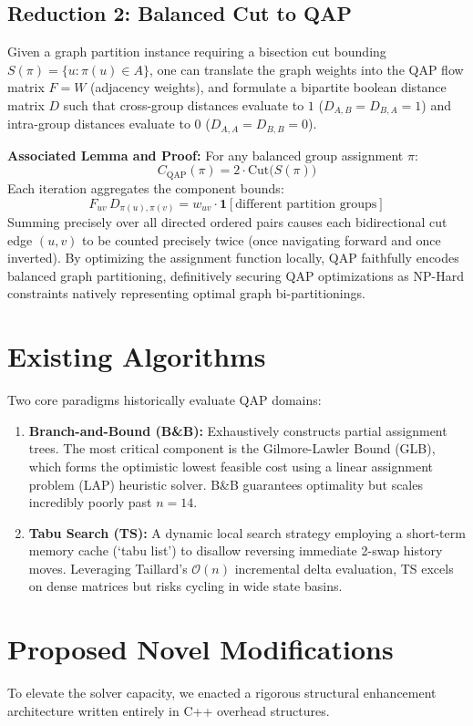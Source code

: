 \documentclass[sigconf,nonacm]{acmart}
\begin{document}
\subsection{Reduction 2: Balanced Cut to QAP}
Given a graph partition instance requiring a bisection cut bounding $S(\pi)=\{u : \pi(u)\in A\}$, one can translate the graph weights into the QAP flow matrix $F = W$ (adjacency weights), and formulate a bipartite boolean distance matrix $D$ such that cross-group distances evaluate to $1$ ($D_{A,B} = D_{B,A} = 1$) and intra-group distances evaluate to $0$ ($D_{A,A} = D_{B,B} = 0$). 

\textbf{Associated Lemma and Proof:}
For any balanced group assignment $\pi$:
\begin{equation}
  C_{\text{QAP}}(\pi) = 2\cdot\mathrm{Cut}\bigl(S(\pi)\bigr)
\end{equation}
Each iteration aggregates the component bounds:
$$F_{uv}\,D_{\pi(u),\pi(v)} = w_{uv}\cdot\mathbf{1}[\text{different partition groups}]$$
Summing precisely over all directed ordered pairs causes each bidirectional cut edge $(u,v)$ to be counted precisely twice (once navigating forward and once inverted). By optimizing the assignment function locally, QAP faithfully encodes balanced graph partitioning, definitively securing QAP optimizations as NP-Hard constraints natively representing optimal graph bi-partitionings.

\section{Existing Algorithms}
Two core paradigms historically evaluate QAP domains:
\begin{enumerate}
    \item \textbf{Branch-and-Bound (B\&B):} Exhaustively constructs partial assignment trees. The most critical component is the Gilmore-Lawler Bound (GLB), which forms the optimistic lowest feasible cost using a linear assignment problem (LAP) heuristic solver. B\&B guarantees optimality but scales incredibly poorly past $n=14$.
    \item \textbf{Tabu Search (TS):} A dynamic local search strategy employing a short-term memory cache (`tabu list') to disallow reversing immediate 2-swap history moves. Leveraging Taillard's $\mathcal{O}(n)$ incremental delta evaluation, TS excels on dense matrices but risks cycling in wide state basins.
\end{enumerate}

\section{Proposed Novel Modifications}
To elevate the solver capacity, we enacted a rigorous structural enhancement architecture written entirely in C++ overhead structures.
\end{document}
